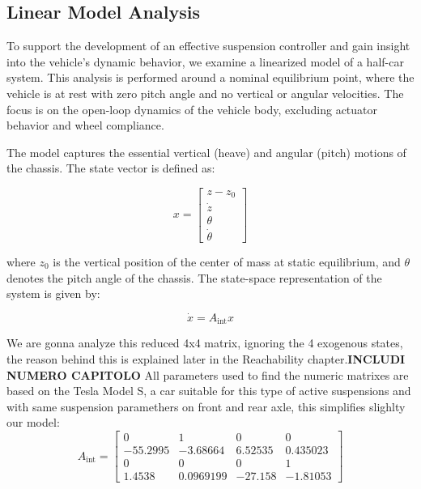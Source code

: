 \documentclass[]{report}
\begin{document}
	
	\newpage
	
	
	\subsection{Linear Model Analysis}
	
	To support the development of an effective suspension controller and gain insight into the vehicle's dynamic behavior, we examine a linearized model of a half-car system. This analysis is performed around a nominal equilibrium point, where the vehicle is at rest with zero pitch angle and no vertical or angular velocities. The focus is on the open-loop dynamics of the vehicle body, excluding actuator behavior and wheel compliance.
	
	The model captures the essential vertical (heave) and angular (pitch) motions of the chassis. The state vector is defined as:
	
	\begin{equation}	
		x = \begin{bmatrix}
			z - z_0 \\
			\dot{z} \\
			\theta \\
			\dot{\theta}
		\end{bmatrix}
	\end{equation}
	
	
	where \( z_0 \) is the vertical position of the center of mass at static equilibrium, and \( \theta \) denotes the pitch angle of the chassis. The state-space representation of the system is given by:
	
	\begin{equation}
		\dot{x} = A_{\text{int}} x
	\end{equation}
	
	
	We are gonna analyze this reduced 4x4 matrix, ignoring the 4 exogenous states, the reason behind this is explained later in the Reachability chapter.\textbf{INCLUDI NUMERO CAPITOLO}  All parameters used to find the numeric matrixes are based on the Tesla Model S, a car suitable for this type of active suspensions and with same suspension paramethers on front and rear axle, this simplifies slighlty our model:
	\[
	A_{\text{int}} =
	\begin{bmatrix}
		0 & 1 & 0 & 0 \\
		-55.2995 & -3.68664 & 6.52535 & 0.435023 \\
		0 & 0 & 0 & 1 \\
		1.4538 & 0.0969199 & -27.158 & -1.81053 
	\end{bmatrix}
	\]
	
\end{document}
